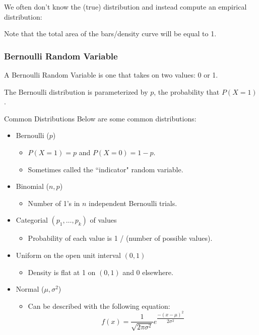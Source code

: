 \documentclass[openany]{book}
\begin{document}
\begin{rmk}
	We often don’t know the (true) distribution and instead compute an empirical distribution:
\end{rmk}

Note that the total area of the bars/density curve will be equal to 1.

\subsubsection{Bernoulli Random Variable}
\begin{defn}
	A Bernoulli Random Variable is one that takes on two values: 0 or 1.
\end{defn}

The Bernoulli distribution is parameterized by $p$, the probability that $P(X = 1)$.

\begin{miscbox}{Common Distributions}
	Below are some common distributions:
	\begin{itemize}
		\item Bernoulli ($p$)
		\begin{itemize}
			\item $P(X=1) = p$ and $P(X = 0) = 1 - p$.
			\item Sometimes called the ``indicator" random variable.
		\end{itemize}
		\item Binomial ($n,p$)
		\begin{itemize}
			\item Number of 1's in $n$ independent Bernoulli trials.
		\end{itemize}
		\item Categorial $(p_1, \ldots, p_k)$ of values
		\begin{itemize}
			\item Probability of each value is 1 / (number of possible values).
		\end{itemize}
		\item Uniform on the open unit interval $(0,1)$
		\begin{itemize}
			\item Density is flat at 1 on $(0,1)$ and 0 elsewhere.
		\end{itemize}
		\item Normal ($\mu, \sigma^{2}$)
		\begin{itemize}
			\item Can be described with the following equation:
			\begin{equation*}
			f(x) = \dfrac{1}{\sqrt{2\pi\sigma^{2}}}e^{ \dfrac{-(x-\mu)^{2}}{2\sigma^{2}}}
		\end{equation*}
		\end{itemize}
	\end{itemize}
\end{miscbox}
\end{document}
